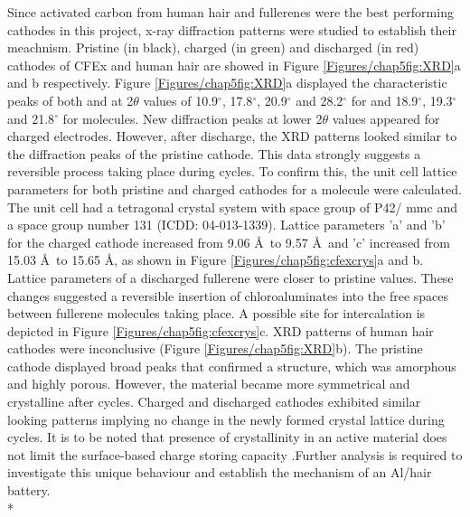 Since activated carbon from human hair and fullerenes were the best performing cathodes in this project, x-ray diffraction patterns were studied to establish their meachnism. Pristine (in black), charged (in green) and discharged (in red) cathodes of CFEx and human hair are showed in Figure \ref{Figures/chap5fig:XRD}a and b respectively. Figure \ref{Figures/chap5fig:XRD}a displayed the characteristic peaks of both  and  at 2$\theta$ values of 10.9$^{\circ}$, 17.8$^{\circ}$, 20.9$^{\circ}$ and 28.2$^{\circ}$ for  and 18.9$^{\circ}$, 19.3$^{\circ}$ and 21.8$^{\circ}$ for  molecules. New diffraction peaks at lower 2$\theta$ values appeared for charged electrodes. However, after discharge, the XRD patterns looked similar to the diffraction peaks of the pristine cathode. This data strongly suggests a reversible process taking place during cycles. To confirm this, the unit cell lattice parameters for both pristine and charged cathodes for a  molecule were calculated. The unit cell had a tetragonal crystal system with space group of P42/ mmc and a space group number 131 (ICDD: 04-013-1339). Lattice parameters 'a' and 'b' for the charged cathode increased from 9.06 \AA\ to 9.57 \AA\ and 'c' increased from 15.03 \AA\ to 15.65 \AA, as shown in Figure \ref{Figures/chap5fig:cfexcrys}a and b. Lattice parameters of a discharged fullerene were closer to pristine values. These changes suggested a reversible insertion of chloroaluminates into the free spaces between fullerene molecules taking place. A possible site for  intercalation is depicted in Figure \ref{Figures/chap5fig:cfexcrys}c. XRD patterns of human hair cathodes were inconclusive (Figure \ref{Figures/chap5fig:XRD}b). The pristine cathode displayed broad peaks that confirmed a structure, which was amorphous and highly porous. However, the material became more symmetrical and crystalline after cycles. Charged and discharged cathodes exhibited similar looking patterns implying no change in the newly formed crystal lattice during cycles. It is to be noted that presence of crystallinity in an active material does not limit the surface-based charge storing capacity \cite{kim_synthesis_2006, jow_factors_2018}.Further analysis is required to investigate this unique behaviour and establish the mechanism of an Al/hair battery.\\*

